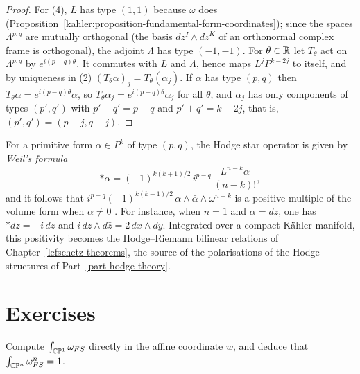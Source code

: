 \begin{proof}
For (4), $L$ has type $(1,1)$ because $\omega$ does (Proposition~\ref{kahler:proposition-fundamental-form-coordinates}); since the spaces
$\Lambda^{p,q}$ are mutually orthogonal (the basis $dz^I \wedge d\bar z^K$ of an orthonormal complex frame is orthogonal), the adjoint $\Lambda$ has
type $(-1,-1)$. For $\theta \in \mathbb{R}$ let $T_\theta$ act on $\Lambda^{p,q}$ by $e^{i(p-q)\theta}$. It commutes with $L$ and $\Lambda$, hence maps
$L^jP^{k-2j}$ to itself, and by uniqueness in (2) $(T_\theta\alpha)_j = T_\theta(\alpha_j)$. If $\alpha$ has type $(p,q)$ then
$T_\theta\alpha = e^{i(p-q)\theta}\alpha$, so $T_\theta\alpha_j = e^{i(p-q)\theta}\alpha_j$ for all $\theta$, and $\alpha_j$ has only components of
types $(p', q')$ with $p' - q' = p - q$ and $p' + q' = k - 2j$, that is, $(p', q') = (p - j, q - j)$.
\end{proof}

\begin{remark}\label{kahler:remark-hodge-riemann-pointwise}
For a primitive form $\alpha \in P^k$ of type $(p,q)$, the Hodge star operator is given by \emph{Weil's formula}
\[
*\alpha = (-1)^{k(k+1)/2}\,i^{p-q}\,\frac{L^{n-k}\alpha}{(n-k)!},
\]
and it follows that $i^{p-q}(-1)^{k(k-1)/2}\,\alpha \wedge \bar\alpha \wedge \omega^{n-k}$ is a positive multiple of the volume form when
$\alpha \neq 0$ \cite[Section 1.2]{huybrechts-complex}. For instance, when $n = 1$ and $\alpha = dz$, one has $*dz = -i\,dz$ and
$i\,dz \wedge d\bar z = 2\,dx \wedge dy$. Integrated over a compact K\"ahler manifold, this positivity becomes the Hodge--Riemann bilinear relations of
Chapter~\ref{lefschetz-theorems}, the source of the polarisations of the Hodge structures of Part~\ref{part-hodge-theory}.
\end{remark}

\section{Exercises}\label{kahler:section-exercises}

\begin{exercise}\label{kahler:exercise-fubini-study-line}
Compute $\int_{\mathbb{C}\mathbb{P}^1}\omega_{FS}$ directly in the affine coordinate $w$, and deduce that $\int_{\mathbb{C}\mathbb{P}^n}\omega_{FS}^n = 1$.
\end{exercise}

